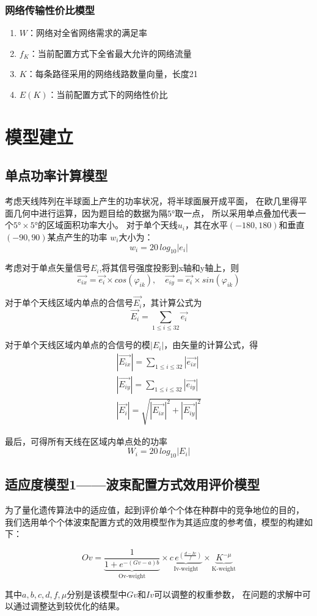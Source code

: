 \documentclass[UTF8,12pt]{ctexart}
\begin{document}
\subsubsection{网络传输性价比模型}
\begin{enumerate}
    \item $W$：网络对全省网络需求的满足率
    \item $f_K$：当前配置方式下全省最大允许的网络流量
    \item $K$：每条路径采用的网络线路数量向量，长度21
    \item $E(K)$：当前配置方式下的网络性价比
\end{enumerate}

\newpage

\section{模型建立}
\subsection{单点功率计算模型}
考虑天线阵列在半球面上产生的功率状况，将半球面展开成平面，
在欧几里得平面几何中进行运算，因为题目给的数据为隔$5°$取一点，
所以采用单点叠加代表一个$5°×5°$的区域面积功率大小。
对于单个天线$u_i$，其在水平$(-180,180)$和垂直$(-90,90)$某点产生的功率
$w_i$大小为：$$w_i = 20\, log_{10}{|e_i|}$$\par

考虑对于单点矢量信号$E_i$,将其信号强度投影到x轴和y轴上，则
$$\vec{e_{ix}} = \vec{e_{i}}×cos(\varphi_{ik}), \quad
    \vec{e_{iy}} = \vec{e_{i}}×sin(\varphi_{ik})$$\par

对于单个天线区域内单点的合信号$\vec{E_{i}}$，其计算公式为
$$\vec{E_{i}}=\sum_{1\leqslant i \leqslant 32} \vec{e_{i}}$$\par

对于单个天线区域内单点的合信号的模$|E_i|$，由矢量的计算公式，得
\begin{gather*}
    |\vec {E_{ix}}| = \sum_{1\le i \le 32} |\vec {e_{ix}}|\\
    |\vec {E_{iy}}| = \sum_{1\le i \le 32} |\vec {e_{iy}}|\\
    |\vec {E_i}| = \sqrt{|\vec {E_{ix}}|^{2}+|\vec {E_{iy}}|^{2}}
\end{gather*}\par
最后，可得所有天线在区域内单点处的功率
$$W_i = 20\, log_{10}{|E_i|}$$


\subsection[适应度模型1]{适应度模型1——波束配置方式效用评价模型}\label{SYDY}
为了量化遗传算法中的适应值，起到评价单个个体在种群中的竞争地位的目的，
我们选用单个个体波束配置方式的效用模型作为其适应度的参考值，模型的构建如下：
\begin{Large}
    $$Ov = \underbrace{\frac{1}{1+e^{-(Gv-a)b}}}_{\text{Ov-weight}}×\underbrace{c\, e^{(\frac{d-Iv}{f})}}_{\text{Iv-weight}}×\underbrace{{K}^{-μ}}_{\text{K-weight}}$$
\end{Large}
其中$a,b,c,d,f,μ$分别是该模型中$Gv$和$Iv$可以调整的权重参数，
在问题的求解中可以通过调整达到较优化的结果。\par
\end{document}
